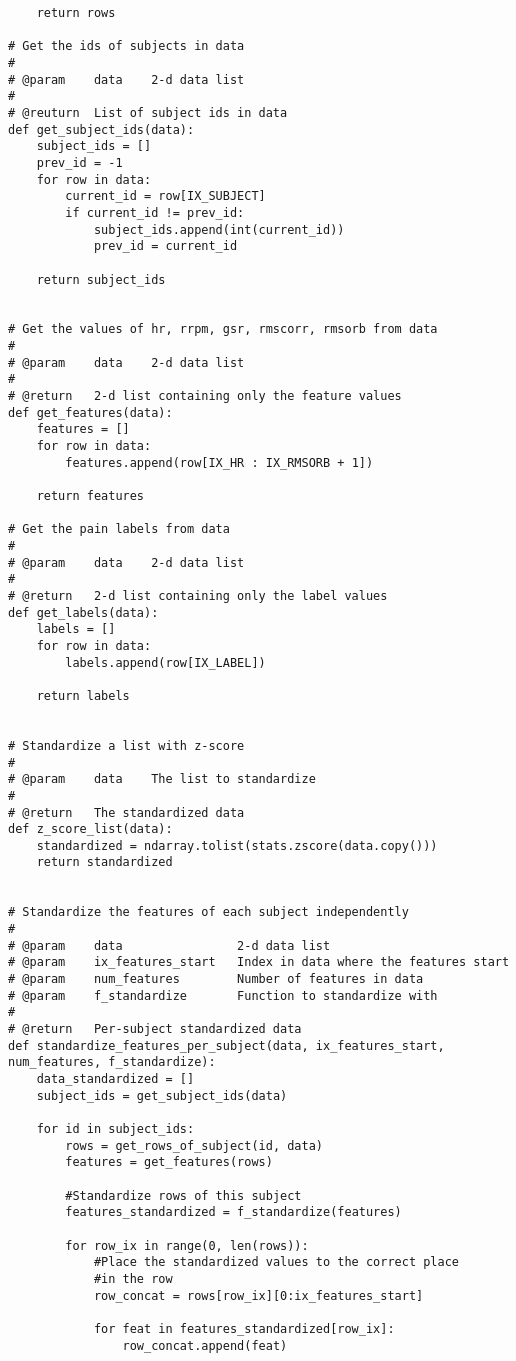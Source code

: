 \documentclass[a4paper]{article}
\begin{document}
\begin{lstlisting}
    return rows

# Get the ids of subjects in data
#
# @param    data    2-d data list
#
# @reuturn  List of subject ids in data  
def get_subject_ids(data):
    subject_ids = []
    prev_id = -1
    for row in data:
        current_id = row[IX_SUBJECT]
        if current_id != prev_id:
            subject_ids.append(int(current_id))
            prev_id = current_id

    return subject_ids


# Get the values of hr, rrpm, gsr, rmscorr, rmsorb from data
#
# @param    data    2-d data list
#
# @return   2-d list containing only the feature values
def get_features(data):
    features = []
    for row in data:
        features.append(row[IX_HR : IX_RMSORB + 1])

    return features

# Get the pain labels from data
#
# @param    data    2-d data list
#
# @return   2-d list containing only the label values
def get_labels(data):
    labels = []
    for row in data:
        labels.append(row[IX_LABEL])

    return labels


# Standardize a list with z-score
# 
# @param    data    The list to standardize
#
# @return   The standardized data
def z_score_list(data):
    standardized = ndarray.tolist(stats.zscore(data.copy()))
    return standardized


# Standardize the features of each subject independently
#
# @param    data                2-d data list
# @param    ix_features_start   Index in data where the features start
# @param    num_features        Number of features in data
# @param    f_standardize       Function to standardize with
#
# @return   Per-subject standardized data
def standardize_features_per_subject(data, ix_features_start, num_features, f_standardize):
    data_standardized = []
    subject_ids = get_subject_ids(data)

    for id in subject_ids:
        rows = get_rows_of_subject(id, data)
        features = get_features(rows)
        
        #Standardize rows of this subject
        features_standardized = f_standardize(features)

        for row_ix in range(0, len(rows)):
            #Place the standardized values to the correct place 
            #in the row 
            row_concat = rows[row_ix][0:ix_features_start]

            for feat in features_standardized[row_ix]:
                row_concat.append(feat)


\end{lstlisting}
\end{document}
